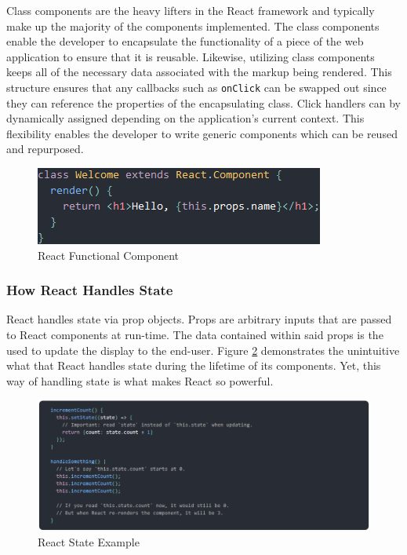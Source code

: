 \documentclass[12pt]{report}
\begin{document}
Class components are the heavy lifters in the React framework and typically make up the majority of the components implemented. The class components enable the developer to encapsulate the functionality of a piece of the web application to ensure that it is reusable. Likewise, utilizing class components keeps all of the necessary data associated with the markup being rendered. This structure ensures that any callbacks such as \texttt{onClick} can be swapped out since they can reference the properties of the encapsulating class. Click handlers can by dynamically assigned depending on the application's current context. This flexibility enables the developer to write generic components which can be reused and repurposed.

\begin{figure}[h]
	\centering
	\includegraphics[scale=0.5]{react_class_component}
	\caption{React Functional Component}
	\label{fig:reactclasscomponent}
\end{figure}

\subsubsection*{How React Handles State}

React handles state via prop objects. Props are arbitrary inputs that are passed to React components at run-time. The data contained within said props is the used to update the display to the end-user. Figure \ref{fig:reactstateexample} demonstrates the unintuitive what that React handles state during the lifetime of its components. Yet, this way of handling state is what makes React so powerful.

\begin{figure}[h]
	\centering
	\includegraphics[scale=0.5]{react_state_example}
	\caption{React State Example}
	\label{fig:reactstateexample}
\end{figure}
\end{document}
